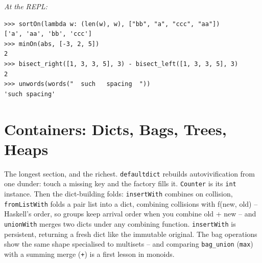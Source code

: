 \documentclass[11pt,letterpaper]{book}
\begin{document}
\noindent\textit{At the REPL:}
\begin{lstlisting}[style=spec]
>>> sortOn(lambda w: (len(w), w), ["bb", "a", "ccc", "aa"])
['a', 'aa', 'bb', 'ccc']
>>> minOn(abs, [-3, 2, 5])
2
>>> bisect_right([1, 3, 3, 5], 3) - bisect_left([1, 3, 3, 5], 3)
2
>>> unwords(words("  such   spacing  "))
'such spacing'
\end{lstlisting}
\chapter{Containers: Dicts, Bags, Trees, Heaps}

The longest section, and the richest. \texttt{defaultdict} rebuilds
autovivification from one dunder: touch a missing key and the factory fills it.
\texttt{Counter} is its \texttt{int} instance. Then the dict-building folds:
\texttt{insertWith} combines on collision, \texttt{fromListWith} folds a pair
list into a dict, combining collisions with f(new, old) -- Haskell's order, so
groups keep arrival order when you combine old + new -- and \texttt{unionWith}
merges two dicts under any combining function. \texttt{insertWith} is
persistent, returning a fresh dict like the immutable original. The bag
operations show the same shape specialised to
multisets -- and comparing \texttt{bag\_union} (\texttt{max}) with a summing
merge (\texttt{+}) is a first lesson in monoids.
\end{document}
